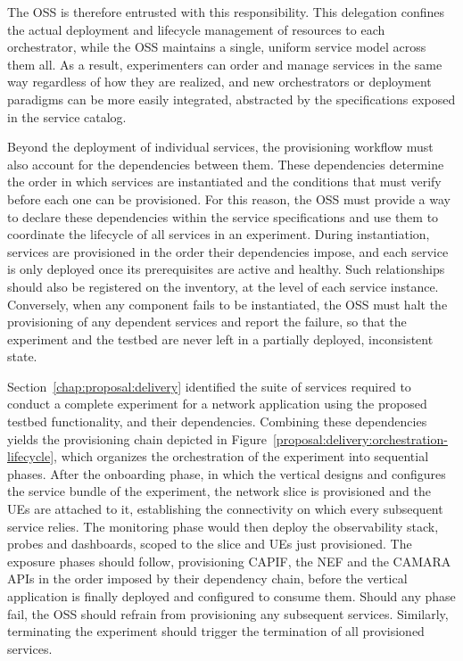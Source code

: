 The \acs{OSS} is therefore entrusted with this responsibility. This delegation confines the actual deployment and lifecycle management of resources to each orchestrator, while the \acs{OSS} maintains a single, uniform service model across them all. As a result, experimenters can order and manage services in the same way regardless of how they are realized, and new orchestrators or deployment paradigms can be more easily integrated, abstracted by the specifications exposed in the service catalog.

Beyond the deployment of individual services, the provisioning workflow must also account for the dependencies between them. These dependencies determine the order in which services are instantiated and the conditions that must verify before each one can be provisioned. For this reason, the \acs{OSS} must provide a way to declare these dependencies within the service specifications and use them to coordinate the lifecycle of all services in an experiment. During instantiation, services are provisioned in the order their dependencies impose, and each service is only deployed once its prerequisites are active and healthy. Such relationships should also be registered on the inventory, at the level of each service instance. Conversely, when any component fails to be instantiated, the \acs{OSS} must halt the provisioning of any dependent services and report the failure, so that the experiment and the testbed are never left in a partially deployed, inconsistent state.

Section~\ref{chap:proposal:delivery} identified the suite of services required to conduct a complete experiment for a network application using the proposed testbed functionality, and their dependencies. Combining these dependencies yields the provisioning chain depicted in Figure~\ref{proposal:delivery:orchestration-lifecycle}, which organizes the orchestration of the experiment into sequential phases. After the onboarding phase, in which the vertical designs and configures the service bundle of the experiment, the network slice is provisioned and the \acsp{UE} are attached to it, establishing the connectivity on which every subsequent service relies. The monitoring phase would then deploy the observability stack, probes and dashboards, scoped to the slice and \acsp{UE} just provisioned. The exposure phases should follow, provisioning \acs{CAPIF}, the \acs{NEF} and the CAMARA \acsp{API} in the order imposed by their dependency chain, before the vertical application is finally deployed and configured to consume them. Should any phase fail, the \acs{OSS} should refrain from provisioning any subsequent services. Similarly, terminating the experiment should trigger the termination of all provisioned services.


